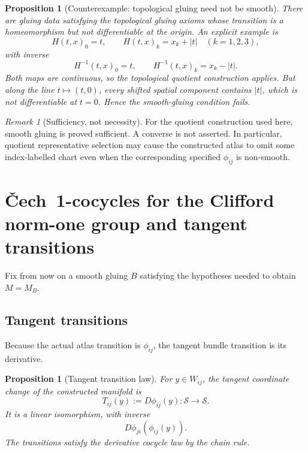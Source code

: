\documentclass[11pt,a4paper]{article}
\newtheorem{proposition}[theorem]{Proposition}
\theoremstyle{definition}
\theoremstyle{remark}
\newtheorem{remark}[theorem]{Remark}
\newcommand{\Smodel}{\mathcal{S}}
\newcommand{\Cech}{\ifmmode\text{\v{C}ech}\else\v{C}ech\fi}
\begin{document}
\begin{proposition}[Counterexample: topological gluing need not be smooth]
\label{prop:nonsmooth-gluing}
There are gluing data satisfying the topological gluing axioms whose
transition is a homeomorphism but not differentiable at the origin.  An explicit example is
\[
   H(t,x)_0=t,
   \qquad
   H(t,x)_k=x_k+|t| \quad(k=1,2,3),
\]
with inverse
\[
   H^{-1}(t,x)_0=t,
   \qquad
   H^{-1}(t,x)_k=x_k-|t|.
\]
Both maps are continuous, so the topological quotient construction applies.  But
along the line \(t\mapsto(t,0)\), every shifted spatial component contains
\(|t|\), which is not differentiable at \(t=0\).  Hence the smooth-gluing
condition fails.
\end{proposition}

\begin{remark}[Sufficiency, not necessity]
\label{rem:smooth-sufficient}
For the quotient construction used here, smooth gluing is proved
sufficient.  A converse is not asserted.  In particular, quotient
representative selection may cause the constructed atlas to omit some
index-labelled chart even when the corresponding specified
\(\phi_{ij}\) is non-smooth.
\end{remark}

\clearpage
\section{\Cech\ 1-cocycles for the Clifford norm-one group and tangent transitions}
\label{sec:tangent}

Fix from now on a smooth gluing \(B\) satisfying the hypotheses needed
to obtain \(M=M_B\).

\subsection{Tangent transitions}

Because the actual atlas transition is \(\phi_{ij}\), the tangent bundle
transition is its derivative.

\begin{proposition}[Tangent transition law]
\label{prop:tangent-transition}
For \(y\in W_{ij}\), the tangent coordinate change of the
constructed manifold is
\[
   T_{ij}(y):=D\phi_{ij}(y):
   \Smodel\longrightarrow\Smodel.
\tag{6.1}\label{eq:tangent-transition}
\]
It is a linear isomorphism, with inverse
\[
   D\phi_{ji}(\phi_{ij}(y)).
\tag{6.2}\label{eq:tangent-inverse}
\]
The transitions satisfy the derivative cocycle law by the chain rule.
\end{proposition}
\end{document}
